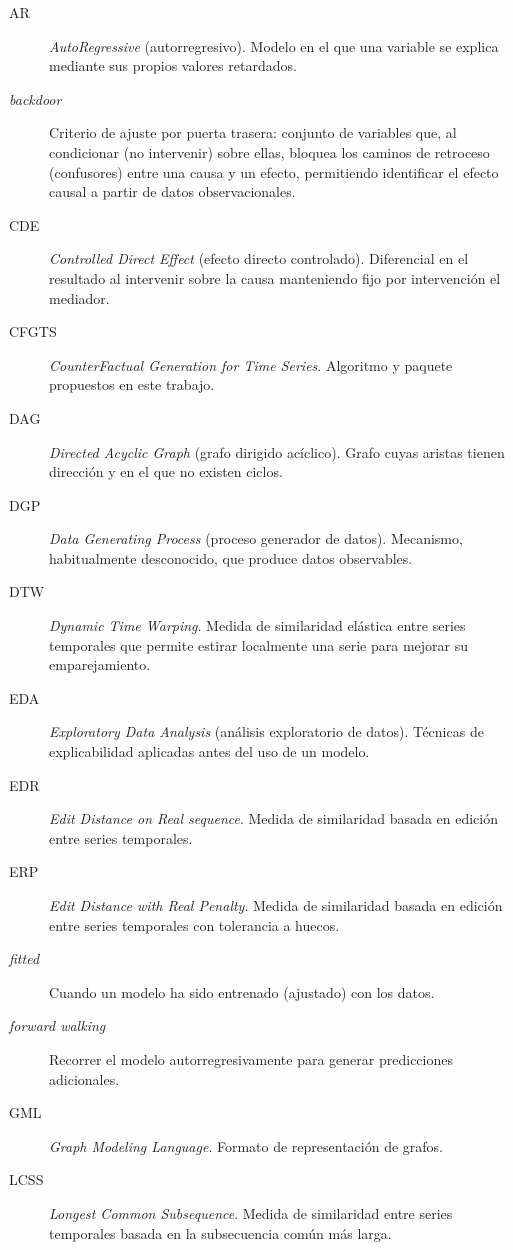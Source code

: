 \documentclass[12pt]{report} %
\begin{document}
\begin{description}
    \item[AR] \textit{AutoRegressive} (autorregresivo). Modelo en el que una variable se explica mediante sus propios valores retardados.
    \item[\textit{backdoor}] Criterio de ajuste por puerta trasera: conjunto de variables que, al condicionar (no intervenir) sobre ellas, bloquea los caminos de retroceso (confusores) entre una causa y un efecto, permitiendo identificar el efecto causal a partir de datos observacionales.
    \item[CDE] \textit{Controlled Direct Effect} (efecto directo controlado). Diferencial en el resultado al intervenir sobre la causa manteniendo fijo por intervención el mediador.
    \item[CFGTS] \textit{CounterFactual Generation for Time Series}. Algoritmo y paquete propuestos en este trabajo.
    \item[DAG] \textit{Directed Acyclic Graph} (grafo dirigido acíclico). Grafo cuyas aristas tienen dirección y en el que no existen ciclos.
    \item[DGP] \textit{Data Generating Process} (proceso generador de datos). Mecanismo, habitualmente desconocido, que produce datos observables.
    \item[DTW] \textit{Dynamic Time Warping}. Medida de similaridad elástica entre series temporales que permite estirar localmente una serie para mejorar su emparejamiento.
    \item[EDA] \textit{Exploratory Data Analysis} (análisis exploratorio de datos). Técnicas de explicabilidad aplicadas antes del uso de un modelo.
    \item[EDR] \textit{Edit Distance on Real sequence}. Medida de similaridad basada en edición entre series temporales.
    \item[ERP] \textit{Edit Distance with Real Penalty}. Medida de similaridad basada en edición entre series temporales con tolerancia a huecos.
    \item[\textit{fitted}] Cuando un modelo ha sido entrenado (ajustado) con los datos.
    \item[\textit{forward walking}] Recorrer el modelo autorregresivamente para generar predicciones adicionales.
    \item[GML] \textit{Graph Modeling Language}. Formato de representación de grafos.
    \item[LCSS] \textit{Longest Common Subsequence}. Medida de similaridad entre series temporales basada en la subsecuencia común más larga.

\end{description}
\end{document}
